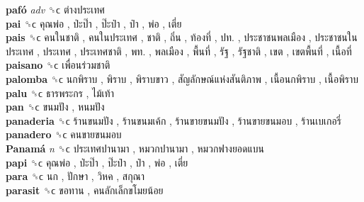 \textbf{pafó} \emph{adv}  ␝ϲ   ต่างประเทศ   \\
\textbf{pai} ␝ϲ   คุณพ่อ ,  ป่ะป๊า ,  ป๊ะป๋า ,  ป๋า ,  พ่อ ,  เตี่ย   \\
\textbf{pais} ␝ϲ   คนในชาติ ,  คนในประเทศ ,  ชาติ ,  ถิ่น ,  ท้องที่ ,  ปท. ,  ประชาชนพลเมือง ,  ประชาชนในประเทศ ,  ประเทศ ,  ประเทศชาติ ,  พท. ,  พลเมือง ,  พื้นที่ ,  รัฐ ,  รัฐชาติ ,  เขต ,  เขตพื้นที่ ,  เนื้อที่   \\
\textbf{paisano} ␝ϲ   เพื่อนร่วมชาติ   \\
\textbf{palomba} ␝ϲ   นกพิราบ ,  พิราบ ,  พิราบขาว ,  สัญลักษณ์แห่งสันติภาพ ,  เนื้อนกพิราบ ,  เนื้อพิราบ   \\
\textbf{palu} ␝ϲ   ธารพระกร ,  ไม้เท้า   \\
\textbf{pan} ␝ϲ   ขนมปัง ,  หนมปัง   \\
\textbf{panaderia} ␝ϲ   ร้านขนมปัง ,  ร้านขนมเค้ก ,  ร้านขายขนมปัง ,  ร้านขายขนมอบ ,  ร้านเบเกอรี่   \\
\textbf{panadero} ␝ϲ   คนขายขนมอบ   \\
\textbf{Panamá} \emph{n}  ␝ϲ   ประเทศปานามา ,  หมวกปานามา ,  หมวกฟางยอดแบน   \\
\textbf{papi} ␝ϲ   คุณพ่อ ,  ป่ะป๊า ,  ป๊ะป๋า ,  ป๋า ,  พ่อ ,  เตี่ย   \\
\textbf{para} ␝ϲ   นก ,  ปักษา ,  วิหค ,  สกุณา   \\
\textbf{parasit} ␝ϲ   ขอทาน ,  คนลักเล็กขโมยน้อย   \\
